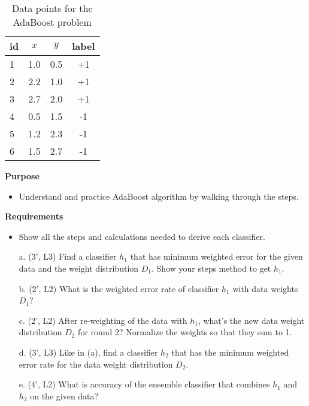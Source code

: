 \begin{table}[!h]
    \label{tab:ab}
    \centering
    \begin{tabular}{l|cc|c}
    \hline

    \hline
    \textbf{id} & $x$ & $y$ & {\bf label}\\
    \hline
         1 & 1.0 & 0.5 & +1\\
         2 & 2.2 & 1.0 & +1\\
         3 & 2.7 & 2.0 & +1\\
         4 & 0.5 & 1.5 & -1\\
         5 & 1.2 & 2.3 & -1\\
         6 & 1.5 & 2.7 & -1\\
    \hline

    \hline
    \end{tabular}
    \caption{Data points for the AdaBoost problem}    
\end{table}

\textbf{Purpose} 
\begin{itemize}
\item Understand and practice AdaBoost algorithm by walking through the steps.
\end{itemize}

\textbf{Requirements}
\begin{itemize}
\item Show all the steps and calculations needed to derive each classifier.
\end{itemize}

\begin{itemize}
    \item[a.] (3', L3) Find a classifier $h_1$ that has minimum weighted error for the given data and the weight distribution $D_1$. Show your steps method to get $h_1$.
    \item[b.] (2', L2) What is the weighted error rate of classifier $h_1$ with data weights $D_1$?
    \item[c.] (2', L2) After re-weighting of the data with $h_1$, what's the new data weight distribution $D_2$ for round 2? Normalize the weights so that they sum to 1.
    \item[d.] (3', L3) Like in (a), find a classifier $h_2$ that has the minimum weighted error rate for the data weight distribution $D_2$.
    \item[e.] (4', L2) What is accuracy of the ensemble classifier that combines $h_1$ and $h_2$ on the given data?
\end{itemize}

